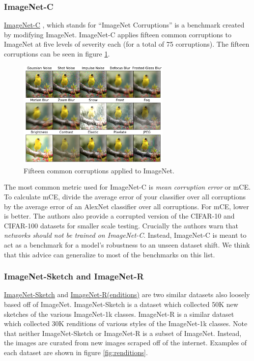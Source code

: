 \documentclass{article}
\begin{document}
\subsubsection{ImageNet-C}
\href{https://paperswithcode.com/sota/domain-generalization-on-imagenet-c}{ImageNet-C} \cite{hendrycks2019benchmarking}, which stands for “ImageNet Corruptions” is a benchmark created by modifying ImageNet. ImageNet-C applies fifteen common corruptions to ImageNet at five levels of severity each (for a total of 75 corruptions). The fifteen corruptions can be seen in figure \ref{fig:corruptions}.

\begin{figure}
    \centering
    \includegraphics[width=7.5cm]{images/corruptions.png}
    \caption{Fifteen common corruptions applied to ImageNet.}
    \label{fig:corruptions}
\end{figure}

The most common metric used for ImageNet-C is \textit{mean corruption error} or mCE. To calculate mCE, divide the average error of your classifier over all corruptions by the average error of an AlexNet classifier over all corruptions. For mCE, lower is better. The authors also provide a corrupted version of the CIFAR-10 and CIFAR-100 datasets for smaller scale testing. Crucially the authors warn that \textit{networks should not be trained on ImageNet-C}. Instead, ImageNet-C is meant to act as a benchmark for a model’s robustness to an unseen dataset shift. We think that this advice can generalize to most of the benchmarks on this list.

\subsubsection{ImageNet-Sketch and ImageNet-R}
\href{https://paperswithcode.com/sota/domain-generalization-on-imagenet-sketch}{ImageNet-Sketch} \cite{wang2019learning} and \href{https://paperswithcode.com/sota/domain-generalization-on-imagenet-r}{ImageNet-R(enditions)} \cite{hendrycks2021faces} are two similar datasets also loosely based off of ImageNet. ImageNet-Sketch is a dataset which collected 50K new sketches of the various ImageNet-1k classes. ImageNet-R is a similar dataset which collected 30K renditions of various styles of the ImageNet-1k classes. Note that neither ImageNet-Sketch or ImageNet-R is a subset of ImageNet. Instead, the images are curated from new images scraped off of the internet. Examples of each dataset are shown in figure \ref{fig:renditions}.
\end{document}
